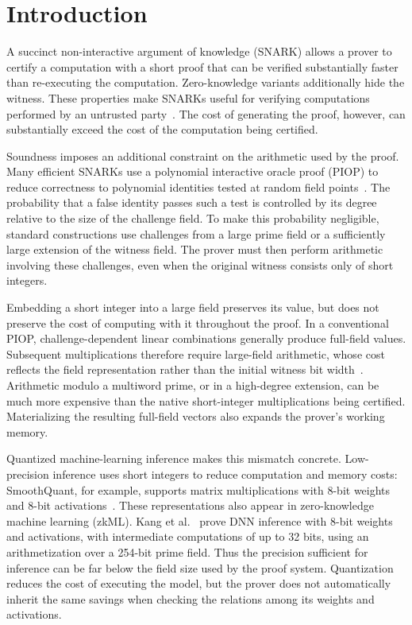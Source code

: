 \section{Introduction}

A succinct non-interactive argument of knowledge (SNARK) allows a
prover to certify a computation with a short proof that can be
verified substantially faster than re-executing the computation.
Zero-knowledge variants additionally hide the witness.
These properties make SNARKs useful for verifying computations
performed by an untrusted party~\cite{eurocrypt/Groth16,crypto/Setty20}.
The cost of generating the proof, however, can substantially exceed
the cost of the computation being certified.

Soundness imposes an additional constraint on the arithmetic used
by the proof.
Many efficient SNARKs use a polynomial interactive oracle proof
(PIOP) to reduce correctness to polynomial identities tested at random
field points~\cite{crypto/Setty20,eurocrypt/ChenBBZ23}.
The probability that a false identity passes such a test is controlled
by its degree relative to the size of the challenge field.
To make this probability negligible, standard constructions use
challenges from a large prime field or a sufficiently large extension
of the witness field.
The prover must then perform arithmetic involving these challenges,
even when the original witness consists only of short integers.

Embedding a short integer into a large field preserves its value,
but does not preserve the cost of computing with it throughout the
proof. In a conventional PIOP, challenge-dependent linear combinations
generally produce full-field values.
Subsequent multiplications therefore require large-field arithmetic,
whose cost reflects the field representation rather than the initial
witness bit width~\cite{iacr/BagadDDT25}.
Arithmetic modulo a multiword prime, or in a high-degree extension,
can be much more expensive than the native short-integer
multiplications being certified.
Materializing the resulting full-field vectors also expands the
prover's working memory.

Quantized machine-learning inference makes this mismatch concrete.
Low-precision inference uses short integers to reduce computation
and memory costs: SmoothQuant, for example, supports matrix
multiplications with 8-bit weights and 8-bit
activations~\cite{icml/XiaoLSWDH23}.
These representations also appear in zero-knowledge machine learning
(zkML). Kang et al.~\cite{corr/KangHSS22} prove DNN inference with
8-bit weights and activations, with intermediate computations of up
to 32 bits, using an arithmetization over a 254-bit prime field.
Thus the precision sufficient for inference can be far below the
field size used by the proof system.
Quantization reduces the cost of executing the model, but the prover
does not automatically inherit the same savings when checking the
relations among its weights and activations.

